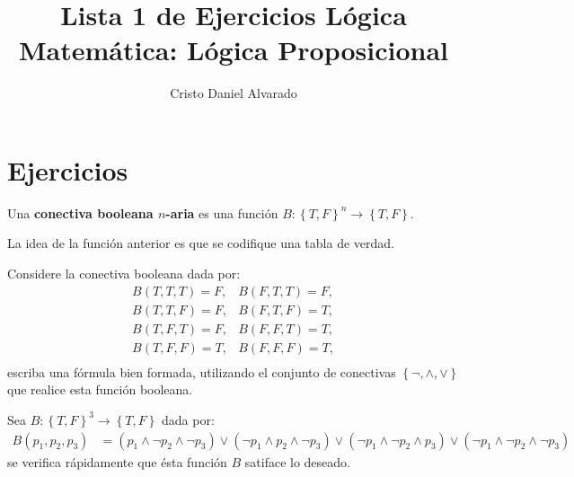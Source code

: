 \documentclass[12pt]{report}
\theoremstyle{largebreak}
\newcommand\cf[3]{\ensuremath{#1:#2\rightarrow#3}}
\begin{document}
    \setlength{\parskip}{5pt} %
    \setlength{\parindent}{12pt} %
    \title{Lista 1 de Ejercicios Lógica Matemática: Lógica Proposicional}
    \author{Cristo Daniel Alvarado}
    \maketitle

    \setcounter{chapter}{1}

    \section{Ejercicios}

    \begin{mydef}
        Una \textbf{conectiva booleana $n$-aria} es una función $\cf{B}{\left\{T,F \right\}^n}{\left\{T,F \right\}}$.
    \end{mydef}

    \begin{obs}
        La idea de la función anterior es que se codifique una tabla de verdad.
    \end{obs}

    \begin{excer}
        Considere la conectiva booleana dada por:
        \begin{equation*}
            \begin{array}{lr}
                B(T,T,T)=F, & B(F,T,T)=F,\\
                B(T,T,F)=F, & B(F,T,F)=T,\\
                B(T,F,T)=F, & B(F,F,T)=T,\\
                B(T,F,F)=T, & B(F,F,F)=T,\\
            \end{array}
        \end{equation*}
        escriba una fórmula bien formada, utilizando el conjunto de conectivas $\left\{\neg,\land,\lor \right\}$ que realice esta función booleana.
    \end{excer}

    \begin{sol}
        Sea $\cf{B}{\left\{T,F \right\}^3}{\left\{T,F \right\}}$ dada por:
        \begin{equation*}
            \begin{split}
                B(p_1,p_2,p_3)&=(p_1\land\neg p_2\land\neg p_3)\lor(\neg p_1\land p_2\land\neg p_3)\lor(\neg p_1\land\neg p_2\land p_3)\lor(\neg p_1\land\neg p_2\land\neg p_3)
            \end{split}
        \end{equation*}
        se verifica rápidamente que ésta función $B$ satiface lo deseado.
    \end{sol}
\end{document}
